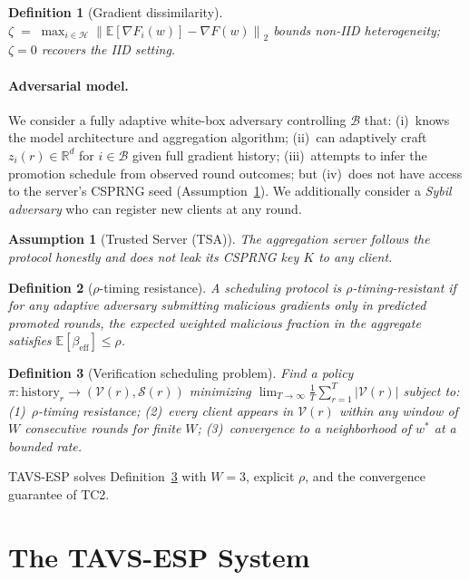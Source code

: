 \documentclass{article}
\newtheorem{definition}{Definition}
\newtheorem{assumption}{Assumption}
\newcommand{\R}{\mathbb{R}}
\newcommand{\E}{\mathbb{E}}
\newcommand{\norm}[1]{\left\lVert #1 \right\rVert}
\newcommand{\calH}{\mathcal{H}}      %
\newcommand{\calB}{\mathcal{B}}      %
\newcommand{\calV}{\mathcal{V}}      %
\newcommand{\calS}{\mathcal{S}}      %
\newcommand{\wstar}{w^{*}}           %
\newcommand{\TAVESP}{\textsc{TAVS-ESP}}
\begin{document}
\begin{definition}[Gradient dissimilarity]
$\zeta \;=\; \max_{i \in \calH} \norm{\E[\nabla F_i(w)] - \nabla F(w)}_2$
bounds non-IID heterogeneity; $\zeta = 0$ recovers the IID setting.
\end{definition}

\paragraph{Adversarial model.}
We consider a fully adaptive white-box adversary controlling $\calB$ that:
(i)~knows the model architecture and aggregation algorithm;
(ii)~can adaptively craft $z_i(r) \in \R^d$ for $i \in \calB$ given full
gradient history;
(iii)~attempts to infer the promotion schedule from observed round outcomes;
but (iv)~does not have access to the server's CSPRNG seed
(Assumption~\ref{assump:tsa}).
We additionally consider a \emph{Sybil adversary} who can register new clients
at any round.

\begin{assumption}[Trusted Server (TSA)]
\label{assump:tsa}
The aggregation server follows the protocol honestly and does not leak its
CSPRNG key $K$ to any client.
\end{assumption}

\begin{definition}[$\rho$-timing resistance]
\label{def:timing}
A scheduling protocol is $\rho$-timing-resistant if for any adaptive adversary
submitting malicious gradients only in predicted promoted rounds, the expected
weighted malicious fraction in the aggregate satisfies
$\E[\beta_{\mathrm{eff}}] \leq \rho$.
\end{definition}

\begin{definition}[Verification scheduling problem]
\label{def:scheduling}
Find a policy $\pi: \mathrm{history}_r \to (\calV(r), \calS(r))$ minimizing
$\lim_{T\to\infty} \frac{1}{T}\sum_{r=1}^T |\calV(r)|$
subject to: (1)~$\rho$-timing resistance; (2)~every client appears in
$\calV(r)$ within any window of $W$ consecutive rounds for finite $W$;
(3)~convergence to a neighborhood of $\wstar$ at a bounded rate.
\end{definition}

\TAVESP{} solves Definition~\ref{def:scheduling} with $W=3$, explicit $\rho$,
and the convergence guarantee of TC2.

\section{The \TAVESP{} System}
\label{sec:system}
\end{document}
